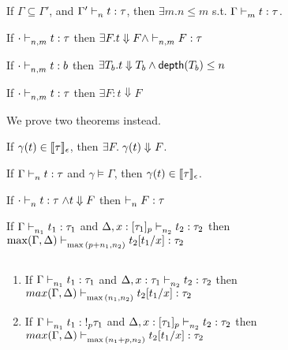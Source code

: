 \documentclass[a4paper,11pt]{article}
\theoremstyle{definition}
\begin{document}
\begin{lem}
	\label{lem:subext}
	If $\Gamma \subseteq \Gamma'$,  and $\Gamma' \mathrel{\vdash_{n}^{} {t} : {\tau}}$, then $\exists m. n \leq m$ s.t.  $\Gamma  \mathrel{\vdash_{m}^{} {t} : {\tau}} $. \\
\end{lem}
%
%
%
\begin{thm}
	If $\cdot \mathrel{\vdash_{n,m}^{} {t} : {\tau}} $ then $ \exists F. t \Downarrow F \land \mathrel{\vdash_{n,m}^{} {F} : {\tau}}$
\end{thm}
%
\begin{coro}
\label{cor:typesafety}
	If $ \cdot\mathrel{\vdash_{n,m}^{} {t} : {b}} $ then $ \exists T_b. t \Downarrow T_b \land \mathsf{depth}(T_b) \leq n$
\end{coro}
%

\begin{thm}[Normalization] 
	If $\cdot\mathrel{\vdash_{n,m}^{} {t} : {\tau}} $ then $ \exists F: t \Downarrow F $
\end{thm}
We prove two theorems instead.
\begin{thm}
If $\gamma(t) \in \llbracket {\tau} \rrbracket_{\epsilon} $, then $\exists F.\mathrel{ { \gamma(t)} \Downarrow^{} { F} }$.
\end{thm}
%
%
\begin{thm}
 If $\Gamma \mathrel{\vdash_{n}^{} {t} : {\tau}}$ and $\gamma \vDash{\Gamma}$, then $\gamma(t) \in \llbracket {\tau} \rrbracket_{\epsilon} $.
\end{thm} 

\begin{thm}[Preservation]
	If $\cdot\mathrel{\vdash_{n}^{} {t} : {\tau}} \land t \Downarrow F$ then $ \mathrel{\vdash_{n}^{} {F} : {\tau}} $
\end{thm}
%
%
\begin{thm} [Substitution]
	If $\Gamma \mathrel{\vdash_{n_1}^{} {t_1} : {\tau_1}}$  and   $\Delta, x: [\tau_1]_p \mathrel{\vdash_{n_2}^{} {t_2} : {\tau_2}}$ then $\max( \Gamma,\Delta) \mathrel{\vdash_{\max{(p + n_1, n_2)}}^{} {t_2[t_1/x]} : {\tau_2}} $
\end{thm}
%
%
\begin{thm} [Substitution] $ $
\label{thm:sub}
\begin{enumerate}
    \item If $\Gamma \mathrel{\vdash_{n_1}^{} {t_1} : {\tau_1}}$  and   $\Delta, x: \tau_1 \mathrel{\vdash_{n_2}^{} {t_2} : {\tau_2}}$ then $max(\Gamma, \Delta) \mathrel{\vdash_{\max{(n_1, n_2)}}^{} {t_2[t_1/x]} : {\tau_2}} $
    \item If $\Gamma \mathrel{\vdash_{n_1}^{} { t_1} : {!_p \tau_1}}$  and   $\Delta, x: [\tau_1]_p \mathrel{\vdash_{n_2}^{} {t_2} : {\tau_2}}$ then $max(\Gamma, \Delta) \mathrel{\vdash_{\max{(n_1 + p, n_2)}}^{} {t_2[t_1/x]} : {\tau_2}} $
\end{enumerate}
\end{thm}
\end{document}
